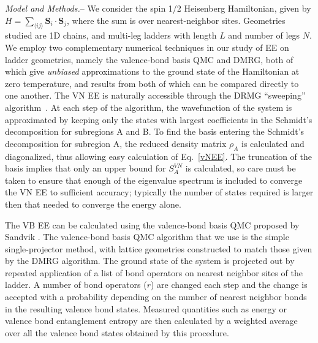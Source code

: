 \documentclass[prl,aps,twocolumn,floatfix,amsmath,amssymb,superscriptaddress,tightenlines]{revtex4}
\begin{document}
{\it Model and Methods.}-- We consider the spin 1/2 Heisenberg
Hamiltonian, given by  
$H =  \sum_{\langle i j \rangle}
{\mathbf S}_i \cdot {\mathbf S}_j \label{ham}$, 
where the sum
is over nearest-neighbor sites.  Geometries studied are 1D chains, and
multi-leg ladders with length $L$ and number of legs $N$.  
We employ two complementary numerical techniques in our study of EE on
ladder geometries, namely the valence-bond basis QMC and DMRG, both of
which give {\it unbiased} approximations to the ground state of the
Hamiltonian at zero temperature, and results from both of which can be
compared directly to one another.  The VN EE is naturally accessible
through the DRMG ``sweeping'' algorithm~\cite{White92, Scholl05}.  At each
step of the algorithm, the wavefunction of the system is approximated by
keeping only the states with largest coefficients in the Schmidt's
decomposition for subregions A and B. To find the basis entering the
Schmidt's decomposition for subregion A, the reduced density matrix
$\rho_A$ is calculated and diagonalized, thus allowing easy calculation
of Eq.~\eqref{vNEE}. The truncation of the basis implies that only an upper
bound for $S^{VN}_{A}$ is calculated, so care must be taken to ensure
that enough of the eigenvalue spectrum is included to converge the VN EE
to sufficient accuracy; typically the number of states required is larger
then that needed to converge the energy alone.

The VB EE \cite{Alet,Chh} can be calculated using the valence-bond basis QMC proposed by
Sandvik \cite{Sandvik}.  The valence-bond basis QMC algorithm that
we use is the simple single-projector method, with lattice geometries
constructed to match those given by the DMRG algorithm.  The ground state
of the system is projected out by repeated application of a list of bond
operators on nearest neighbor sites of the ladder.  A number of bond
operators ($r$) are changed each step and the change is accepted with a
probability depending on the number of nearest neighbor bonds in the
resulting valence bond states.  Measured quantities such as energy or
valence bond entanglement entropy are then calculated by a weighted
average over all the valence bond states obtained by this procedure.
\end{document}
